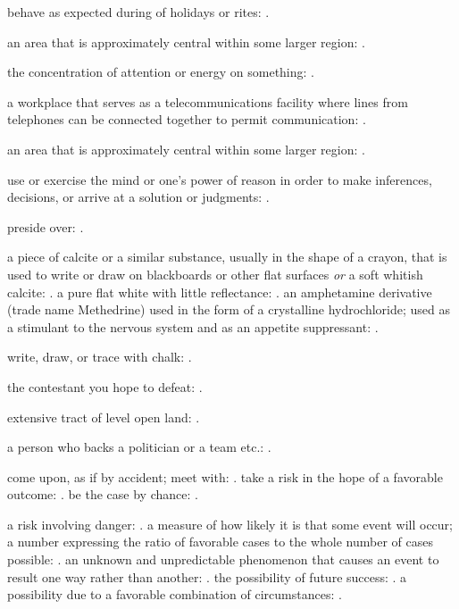   behave as expected during of holidays or rites: .

  an area that is approximately central within some larger region: .

  the concentration of attention or energy on something: .

  a workplace that serves as a telecommunications facility where lines from telephones can be connected together to permit communication: .

  an area that is approximately central within some larger region: .

  use or exercise the mind or one's power of reason in order to make inferences, decisions, or arrive at a solution or judgments: .

  preside over: .

  a piece of calcite or a similar substance, usually in the shape of a crayon, that is used to write or draw on blackboards or other flat surfaces \textit{or} a soft whitish calcite: . a pure flat white with little reflectance: . an amphetamine derivative (trade name Methedrine) used in the form of a crystalline hydrochloride; used as a stimulant to the nervous system and as an appetite suppressant: .

  write, draw, or trace with chalk: .

  the contestant you hope to defeat: .

  extensive tract of level open land: .

  a person who backs a politician or a team etc.: .

  come upon, as if by accident; meet with: . take a risk in the hope of a favorable outcome: . be the case by chance: .

  a risk involving danger: . a measure of how likely it is that some event will occur; a number expressing the ratio of favorable cases to the whole number of cases possible: . an unknown and unpredictable phenomenon that causes an event to result one way rather than another: . the possibility of future success: . a possibility due to a favorable combination of circumstances: .

